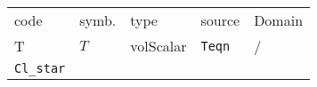 \documentclass[a4paper, landscape]{article}
\title{}
\author{}
\newcommand{\volScalar}{volScalar}
\begin{document}
\begin{tabular}{llllp{}}
code
& symb.
& type
& source 
& Domain
\\
T
& $T$
& \volScalar
& \verb|Teqn|
& / 
\\ \hline
\verb|Cl_star|

\end{tabular}
\end{document}
